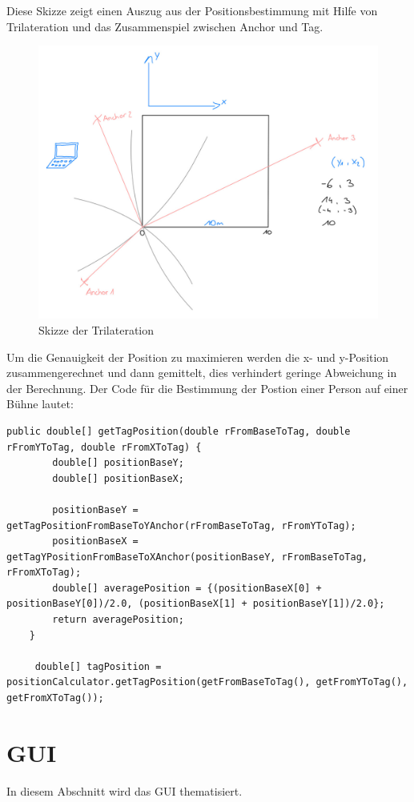 Diese Skizze zeigt einen Auszug aus der Positionsbestimmung mit Hilfe von Trilateration und das Zusammenspiel zwischen Anchor und Tag. 
\begin{figure}[H]
	\centering
	\includegraphics[width=0.8\linewidth]{images/Trilaterationskizze.jpeg}
	\caption[Trilaterationskizze]{Skizze der Trilateration}
	\label{fig:Trilaterationskizze}
\end{figure}

\newpage
Um die Genauigkeit der Position zu maximieren werden die x- und y-Position zusammengerechnet und dann gemittelt, dies verhindert geringe Abweichung in der Berechnung. Der Code für die Bestimmung der Postion einer Person auf einer Bühne lautet:
\begin{lstlisting}[style=Java, caption=Trilateration in Java, captionpos=b]
	public double[] getTagPosition(double rFromBaseToTag, double rFromYToTag, double rFromXToTag) {
		double[] positionBaseY;
		double[] positionBaseX;
		
		positionBaseY = getTagPositionFromBaseToYAnchor(rFromBaseToTag, rFromYToTag);
		positionBaseX = getTagYPositionFromBaseToXAnchor(positionBaseY, rFromBaseToTag, rFromXToTag);
		double[] averagePosition = {(positionBaseX[0] + positionBaseY[0])/2.0, (positionBaseX[1] + positionBaseY[1])/2.0};
		return averagePosition;
	}
	
	 double[] tagPosition = positionCalculator.getTagPosition(getFromBaseToTag(), getFromYToTag(), getFromXToTag());
\end{lstlisting}

\newpage
\section{GUI}
In diesem Abschnitt wird das GUI thematisiert.

